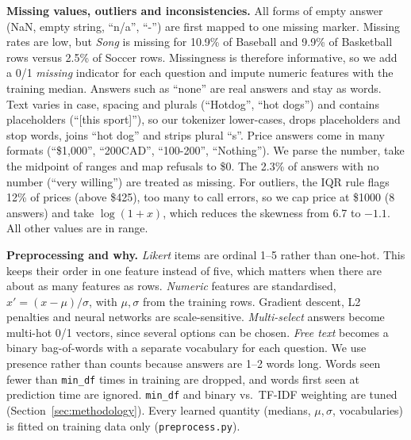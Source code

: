\documentclass[12pt]{article}
\begin{document}
\textbf{Missing values, outliers and inconsistencies.} All forms of empty answer (NaN, empty string, ``n/a'', ``-'') are first mapped to one missing marker. Missing rates are low, but \emph{Song} is missing for 10.9\% of Baseball and 9.9\% of Basketball rows versus 2.5\% of Soccer rows. Missingness is therefore informative, so we add a 0/1 \emph{missing} indicator for each question and impute numeric features with the training median. Answers such as ``none'' are real answers and stay as words. Text varies in case, spacing and plurals (``Hotdog'', ``hot dogs'') and contains placeholders (``[this sport]''), so our tokenizer lower-cases, drops placeholders and stop words, joins ``hot dog'' and strips plural ``s''. Price answers come in many formats (``\$1,000'', ``200CAD'', ``100-200'', ``Nothing''). We parse the number, take the midpoint of ranges and map refusals to \$0. The 2.3\% of answers with no number (``very willing'') are treated as missing. For outliers, the IQR rule flags 12\% of prices (above \$425), too many to call errors, so we cap price at \$1000 (8 answers) and take $\log(1+x)$, which reduces the skewness from 6.7 to $-1.1$. All other values are in range.

\textbf{Preprocessing and why.} \emph{Likert} items are ordinal 1--5 rather than one-hot. This keeps their order in one feature instead of five, which matters when there are about as many features as rows. \emph{Numeric} features are standardised, $x'=(x-\mu)/\sigma$, with $\mu,\sigma$ from the training rows. Gradient descent, L2 penalties and neural networks are scale-sensitive. \emph{Multi-select} answers become multi-hot 0/1 vectors, since several options can be chosen. \emph{Free text} becomes a binary bag-of-words with a separate vocabulary for each question. We use presence rather than counts because answers are 1--2 words long. Words seen fewer than \texttt{min\_df} times in training are dropped, and words first seen at prediction time are ignored. \texttt{min\_df} and binary vs.\ TF-IDF weighting are tuned (Section~\ref{sec:methodology}). Every learned quantity (medians, $\mu,\sigma$, vocabularies) is fitted on training data only (\texttt{preprocess.py}).
\end{document}

